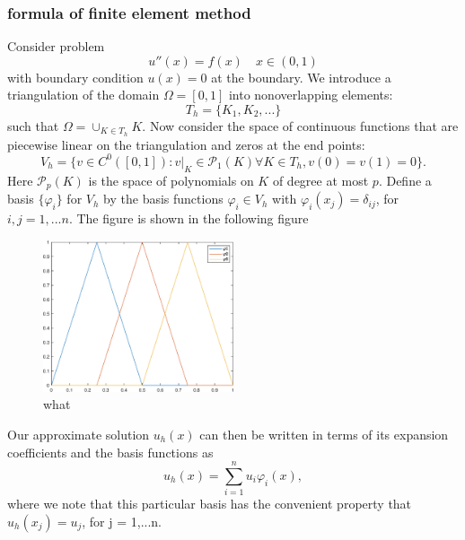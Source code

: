 \documentclass[11pt]{article}
\begin{document}
\subsubsection{formula of finite element method}
Consider problem  
\begin{equation}
\label{equ:poisson_equation}
	u''(x) = f(x) \quad x\in (0,1)
\end{equation}
with boundary condition $u(x)=0$ at the boundary. We introduce a triangulation of the domain $\Omega = [0,1] $ into nonoverlapping elements:
\begin{equation}
\label{equ:triangulation}
	T_h = \{K_1,K_2,...\}
\end{equation}
such that $\Omega = \cup_{K\in T_h}K$. Now consider the space of continuous functions that are piecewise linear on the triangulation and zeros at the end points:
\begin{equation}
\label{equ:basis}
	V_h =\{v\in C^0([0,1]):v|_{K} \in \mathcal{P}_1(K) \forall K \in T_h, v(0) = v(1) = 0\}.
\end{equation}
Here $\mathcal{P}_p(K)$ is the space of polynomials on $K$ of degree at most $p$. Define a basis $\{\varphi_i\}$ for $V_h$ by the basis functions $\varphi_i\in V_h$ with $\varphi_i(x_j) = \delta_{ij}$, for $i,j = 1,...n$. The figure is shown in the following figure
\begin{figure}[htp]
\centering
	\includegraphics[width=0.5\textwidth]{basis_figure}
	\caption{what}
\end{figure}
Our approximate solution $u_h(x)$ can then be written in terms of its expansion coefficients and the basis functions as
\begin{equation}
\label{equ:appro}
	u_h(x) = \sum_{i = 1}^n u_i\varphi_i(x),
\end{equation} 
where we note that this particular basis has the convenient property that $u_h(x_j) = u_j$, for j = 1,...n.
\end{document}
